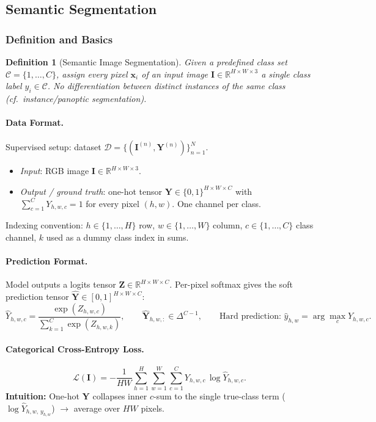 \documentclass{article}
\newtheorem{definition}{Definition}
\begin{document}
\subsection{Semantic Segmentation}
\subsubsection{Definition and Basics}
\begin{definition}[Semantic Image Segmentation]
Given a predefined class set $\mathcal{C} = \{1, \dots, C\}$, assign every pixel $\mathbf{x}_i$ of an input image $\mathbf{I} \in \mathbb{R}^{H \times W \times 3}$ a single class label $y_i \in \mathcal{C}$. No differentiation between distinct instances of the same class (cf.\ instance/panoptic segmentation).
\end{definition}

\paragraph{Data Format.}
Supervised setup: dataset $\mathcal{D} = \{(\mathbf{I}^{(n)}, \mathbf{Y}^{(n)})\}_{n=1}^N$.
\begin{itemize}
    \item \textit{Input}: RGB image $\mathbf{I} \in \mathbb{R}^{H \times W \times 3}$.
    \item \textit{Output / ground truth}: one-hot tensor $\mathbf{Y} \in \{0,1\}^{H \times W \times C}$ with $\sum_{c=1}^{C} Y_{h,w,c} = 1$ for every pixel $(h,w)$. One channel per class.
\end{itemize}
Indexing convention: $h \in \{1,\dots,H\}$ row, $w \in \{1,\dots,W\}$ column, $c \in \{1,\dots,C\}$ class channel, $k$ used as a dummy class index in sums.

\paragraph{Prediction Format.}
Model outputs a logits tensor $\mathbf{Z} \in \mathbb{R}^{H \times W \times C}$. Per-pixel softmax gives the soft prediction tensor $\hat{\mathbf{Y}} \in [0,1]^{H \times W \times C}$:
\begin{equation*}
    \hat{Y}_{h,w,c} = \frac{\exp(Z_{h,w,c})}{\sum_{k=1}^{C} \exp(Z_{h,w,k})}, \qquad \hat{\mathbf{Y}}_{h,w,:} \in \Delta^{C-1}, \qquad \text{Hard prediction: $\hat{y}_{h,w} = \arg\max_c \hat{Y}_{h,w,c}$.}
\end{equation*}

\paragraph{Categorical Cross-Entropy Loss.}
\begin{equation*}
    \mathcal{L}(\mathbf{I}) = -\frac{1}{HW} \sum_{h=1}^{H} \sum_{w=1}^{W} \sum_{c=1}^{C} Y_{h,w,c}\, \log \hat{Y}_{h,w,c}.
\end{equation*}
\textbf{Intuition:} One-hot $\mathbf{Y}$ collapses inner $c$-sum to the single true-class term ($\log \hat{Y}_{h,w,\, y_{h,w}}$) $\rightarrow$ average over $HW$ pixels.
\end{document}
